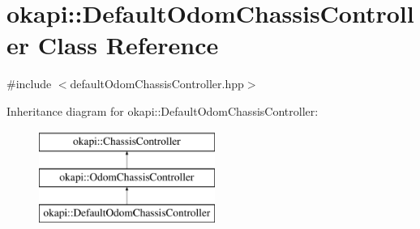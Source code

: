 \hypertarget{classokapi_1_1DefaultOdomChassisController}{}\section{okapi\+::Default\+Odom\+Chassis\+Controller Class Reference}
\label{classokapi_1_1DefaultOdomChassisController}


{\ttfamily \#include $<$default\+Odom\+Chassis\+Controller.\+hpp$>$}

Inheritance diagram for okapi\+::Default\+Odom\+Chassis\+Controller\+:\begin{figure}[H]
\begin{center}
\leavevmode
\includegraphics[height=3.000000cm]{classokapi_1_1DefaultOdomChassisController}
\end{center}
\end{figure}
